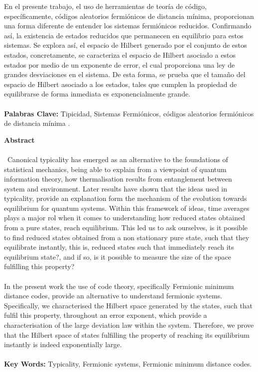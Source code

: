 En el presente trabajo, el uso de herramientas de teoría de código, específicamente, códigos aleatorios fermiónicos de distancia mínima, proporcionan una forma diferente de entender los sistemas fermiónicos reducidos. Confirmando así, la  existencia de estados reducidos que permanecen en equilibrio para estos sistemas. Se explora así, el espacio de Hilbert generado por el conjunto de estos estados, concretamente, se caracteriza el espacio de Hilbert asociado a estos estados por medio de un exponente de error, el cual proporciona una ley de grandes desviaciones en el sistema. De esta forma, se prueba que el tamaño del espacio de Hilbert asociado a los estados, tales que cumplen la propiedad de equilibrarse de forma inmediata es exponencialmente grande.\\\\
\textbf{\small Palabras Clave:} Tipicidad, Sistemas Fermiónicos, códigos aleatorios fermiónicos de distancia mínima .
\newpage{}
\textbf{\LARGE Abstract}\\\\
\
Canonical typicality has emerged as an alternative to the foundations of statistical mechanics, being able to explain from a viewpoint of quantum information theory, how thermalisation results from entanglement between system and environment. Later results have shown that the ideas used in typicality, provide an explanation form the mechanism of the evolution towards equilibrium for quantum systems. Within this framework of ideas, time averages plays a major rol when it comes to understanding how reduced states obtained from a pure states, reach equilibrium. This led us to ask ourselves, is it possible to find reduced states obtained from a non stationary pure state, such that they equilibrate instantly, this is, reduced states such that immediately reach its equilibrium state?, and if so, is it possible to measure the size of the space fulfilling this property? \\\\

In the present work the use of code theory, specifically Fermionic minimum distance codes, provide an alternative to understand fermionic systems. Specifically, we characterised the Hilbert space generated by the states, such that fulfil this property, throughout an error exponent, which provide a characterisation of the large deviation law within the system. Therefore, we prove that the Hilbert space of states fulfilling the property of reaching its equilibrium instantly is indeed exponentially large.\\\\
\textbf{\small Key Words: }Typicality, Fermionic systems, Fermionic minimum distance codes.
\newpage{}

